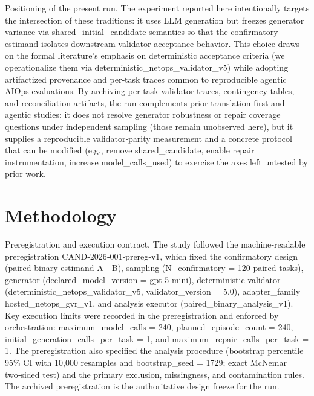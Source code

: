 \documentclass[conference]{IEEEtran}
\begin{document}
Positioning of the present run. The experiment reported here intentionally targets the intersection of these traditions: it uses LLM generation but freezes generator variance via shared\_initial\_candidate semantics so that the confirmatory estimand isolates downstream validator‑acceptance behavior. This choice draws on the formal literature's emphasis on deterministic acceptance criteria (we operationalize them via deterministic\_netops\_validator\_v5) while adopting artifactized provenance and per‑task traces common to reproducible agentic AIOps evaluations. By archiving per‑task validator traces, contingency tables, and reconciliation artifacts, the run complements prior translation‑first and agentic studies: it does not resolve generator robustness or repair coverage questions under independent sampling (those remain unobserved here), but it supplies a reproducible validator‑parity measurement and a concrete protocol that can be modified (e.g., remove shared\_candidate, enable repair instrumentation, increase model\_calls\_used) to exercise the axes left untested by prior work.

\section{Methodology}
Preregistration and execution contract. The study followed the machine‑readable preregistration CAND‑2026‑001‑prereg‑v1, which fixed the confirmatory design (paired binary estimand A - B), sampling (N\_confirmatory = 120 paired tasks), generator (declared\_model\_version = gpt‑5‑mini), deterministic validator (deterministic\_netops\_validator\_v5, validator\_version = 5.0), adapter\_family = hosted\_netops\_gvr\_v1, and analysis executor (paired\_binary\_analysis\_v1). Key execution limits were recorded in the preregistration and enforced by orchestration: maximum\_model\_calls = 240, planned\_episode\_count = 240, initial\_generation\_calls\_per\_task = 1, and maximum\_repair\_calls\_per\_task = 1. The preregistration also specified the analysis procedure (bootstrap percentile 95\% CI with 10,000 resamples and bootstrap\_seed = 1729; exact McNemar two‑sided test) and the primary exclusion, missingness, and contamination rules. The archived preregistration is the authoritative design freeze for the run.
\end{document}
